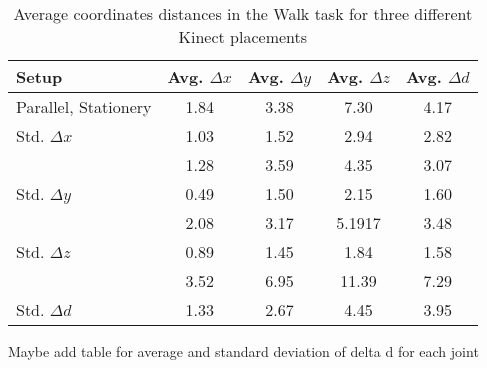 \begin{table}[!htb]
\centering
\begin{tabularx}{1.0\columnwidth}{||X c c c c||} 
 \hline
 \textbf{Setup} & Avg. $\Delta x$ & Avg. $\Delta y$ & Avg. $\Delta z$ & Avg. $\Delta d$ \\ [0.5ex] 
 \hline\hline
Parallel, Stationery & 1.84 & 3.38 & 7.30 & 4.17 \\
 \hline
 Std. $\Delta x$ & 1.03 & 1.52 & 2.94 & 2.82 \\
 \hline
  & 1.28 & 3.59 & 4.35 & 3.07 \\
 \hline
 Std. $\Delta y$ & 0.49 & 1.50 & 2.15 & 1.60 \\
 \hline
  & 2.08 & 3.17 & 5.1917 & 3.48 \\
 \hline
 Std. $\Delta z$ & 0.89 & 1.45 & 1.84 & 1.58 \\
 \hline
  & 3.52 & 6.95 & 11.39 & 7.29 \\
 \hline
 Std. $\Delta d$ & 1.33 & 2.67 & 4.45 & 3.95 \\
 \hline
\end{tabularx}
\caption{Average coordinates distances in the Walk task for three different Kinect placements}
\label{table:overall_coordinates_values}
\end{table}
\FloatBarrier

Maybe add table for average and standard deviation of delta d for each joint

